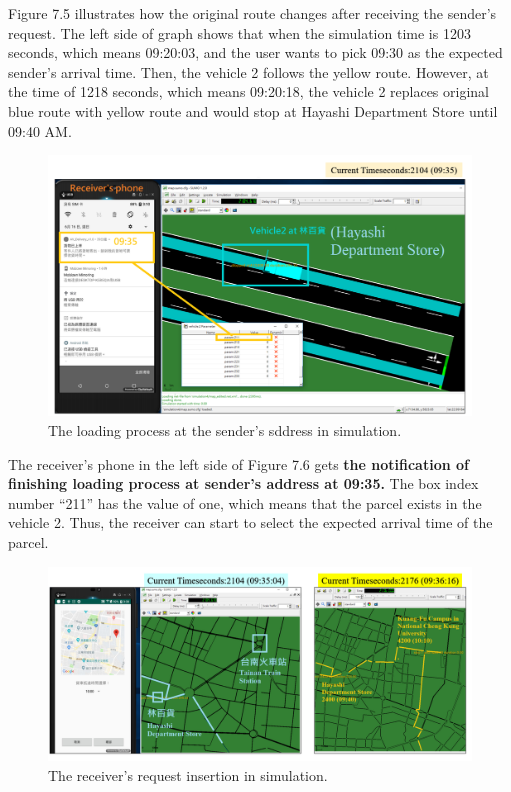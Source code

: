 \documentclass[12pt]{ksthesis}
\begin{document}
\begin{thesis}
{Figure 7.5 illustrates how the original route changes after receiving the sender’s request.
The left side of graph shows that when the simulation time is 1203 seconds, which means 09:20:03, and the user wants to pick 09:30 as the expected sender’s arrival time. Then, the vehicle 2 follows the yellow route. 
However, at the time of 1218 seconds, which means 09:20:18, the vehicle 2 replaces original blue route with yellow route and would stop at Hayashi Department Store until 09:40 AM.


\begin{figure}[H]
\centering
\includegraphics[width=1.0\textwidth]{./Thesis_figures/F7-6_loadingProcess.PNG}
\caption{\large The loading process at the sender’s sddress in simulation.}
\vspace{0.5cm}
\label{Fig:LoadingProcess}
\end{figure}

The receiver’s phone in the left side of Figure 7.6 gets \textbf{the notification of finishing loading process at sender’s address at 09:35.} The box index number “211” has the value of one, which means that the parcel exists in the vehicle 2. 
Thus, the receiver can start to select the expected arrival time of the parcel.




\begin{figure}[H]
\centering
\includegraphics[width=1.0\textwidth]{./Thesis_figures/F7-7_receiverRequest.PNG}
\caption{\large The receiver’s request insertion in simulation.}
\vspace{0.5cm}


\end{figure}}
\end{thesis}
\end{document}
